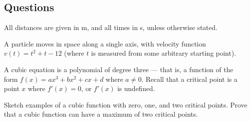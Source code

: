 \subsection*{Questions}
All distances are given in \si{\metre}, and all times in \si{\second}, unless otherwise stated.
\begin{questions}
  \question A particle moves in space along a single axis, with velocity function $ v(t) = t^2 + t - 12 $ (where $ t $ is measured from some
            arbitrary starting point).
  \question A cubic equation is a polynomial of degree three --- that is, a function
            of the form $ f(x) = ax^3 + bx^2 + cx + d $ where $ a \neq 0 $. Recall that
            a critical point is a point $ x $ where $ f'(x) = 0 $, or $ f'(x) $ is undefined.
            \begin{subparts}
              \subpart Sketch examples of a cubic function with zero, one, and two critical points.
              \subpart Prove that a cubic function can have a maximum of two critical points.
            \end{subparts}

\end{questions}


